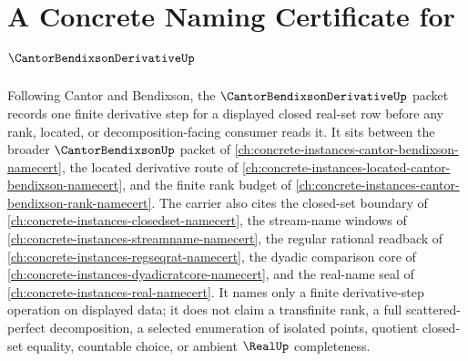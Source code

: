 \chapter{A Concrete Naming Certificate for $\CantorBendixsonDerivativeUp$}
\label{ch:concrete-instances-cantor-bendixson-derivative-namecert}

Following Cantor and Bendixson, the $\CantorBendixsonDerivativeUp$ packet records one finite derivative step for a displayed closed real-set row before any rank, located, or decomposition-facing consumer reads it. It sits between the broader $\CantorBendixsonUp$ packet of \autoref{ch:concrete-instances-cantor-bendixson-namecert}, the located derivative route of \autoref{ch:concrete-instances-located-cantor-bendixson-namecert}, and the finite rank budget of \autoref{ch:concrete-instances-cantor-bendixson-rank-namecert}. The carrier also cites the closed-set boundary of \autoref{ch:concrete-instances-closedset-namecert}, the stream-name windows of \autoref{ch:concrete-instances-streamname-namecert}, the regular rational readback of \autoref{ch:concrete-instances-regseqrat-namecert}, the dyadic comparison core of \autoref{ch:concrete-instances-dyadicratcore-namecert}, and the real-name seal of \autoref{ch:concrete-instances-real-namecert}. It names only a finite derivative-step operation on displayed data; it does not claim a transfinite rank, a full scattered-perfect decomposition, a selected enumeration of isolated points, quotient closed-set equality, countable choice, or ambient $\RealUp$ completeness.

